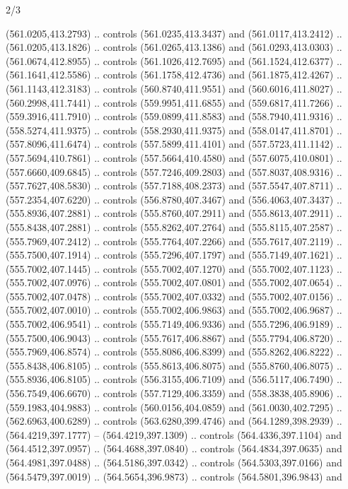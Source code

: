 \begin{flagdescription}{2/3}
\begin{scope}[xshift=0.5\flaglength,yshift=0.5\flagwidth,scale=\flagwidth/495.65]
\begin{scope}[y=0.8pt, x=0.8pt, yscale=-1,shift={(-463.76,-309.78)}]
  (561.0205,413.2793) .. controls (561.0235,413.3437) and (561.0117,413.2412) ..
  (561.0205,413.1826) .. controls (561.0265,413.1386) and (561.0293,413.0303) ..
  (561.0674,412.8955) .. controls (561.1026,412.7695) and (561.1524,412.6377) ..
  (561.1641,412.5586) .. controls (561.1758,412.4736) and (561.1875,412.4267) ..
  (561.1143,412.3183) .. controls (560.8740,411.9551) and (560.6016,411.8027) ..
  (560.2998,411.7441) .. controls (559.9951,411.6855) and (559.6817,411.7266) ..
  (559.3916,411.7910) .. controls (559.0899,411.8583) and (558.7940,411.9316) ..
  (558.5274,411.9375) .. controls (558.2930,411.9375) and (558.0147,411.8701) ..
  (557.8096,411.6474) .. controls (557.5899,411.4101) and (557.5723,411.1142) ..
  (557.5694,410.7861) .. controls (557.5664,410.4580) and (557.6075,410.0801) ..
  (557.6660,409.6845) .. controls (557.7246,409.2803) and (557.8037,408.9316) ..
  (557.7627,408.5830) .. controls (557.7188,408.2373) and (557.5547,407.8711) ..
  (557.2354,407.6220) .. controls (556.8780,407.3467) and (556.4063,407.3437) ..
  (555.8936,407.2881) .. controls (555.8760,407.2911) and (555.8613,407.2911) ..
  (555.8438,407.2881) .. controls (555.8262,407.2764) and (555.8115,407.2587) ..
  (555.7969,407.2412) .. controls (555.7764,407.2266) and (555.7617,407.2119) ..
  (555.7500,407.1914) .. controls (555.7296,407.1797) and (555.7149,407.1621) ..
  (555.7002,407.1445) .. controls (555.7002,407.1270) and (555.7002,407.1123) ..
  (555.7002,407.0976) .. controls (555.7002,407.0801) and (555.7002,407.0654) ..
  (555.7002,407.0478) .. controls (555.7002,407.0332) and (555.7002,407.0156) ..
  (555.7002,407.0010) .. controls (555.7002,406.9863) and (555.7002,406.9687) ..
  (555.7002,406.9541) .. controls (555.7149,406.9336) and (555.7296,406.9189) ..
  (555.7500,406.9043) .. controls (555.7617,406.8867) and (555.7794,406.8720) ..
  (555.7969,406.8574) .. controls (555.8086,406.8399) and (555.8262,406.8222) ..
  (555.8438,406.8105) .. controls (555.8613,406.8075) and (555.8760,406.8075) ..
  (555.8936,406.8105) .. controls (556.3155,406.7109) and (556.5117,406.7490) ..
  (556.7549,406.6670) .. controls (557.7129,406.3359) and (558.3838,405.8906) ..
  (559.1983,404.9883) .. controls (560.0156,404.0859) and (561.0030,402.7295) ..
  (562.6963,400.6289) .. controls (563.6280,399.4746) and (564.1289,398.2939) ..
  (564.4219,397.1777) -- (564.4219,397.1309) .. controls (564.4336,397.1104) and
  (564.4512,397.0957) .. (564.4688,397.0840) .. controls (564.4834,397.0635) and
  (564.4981,397.0488) .. (564.5186,397.0342) .. controls (564.5303,397.0166) and
  (564.5479,397.0019) .. (564.5654,396.9873) .. controls (564.5801,396.9843) and

\end{scope}
\end{scope}
\end{flagdescription}
